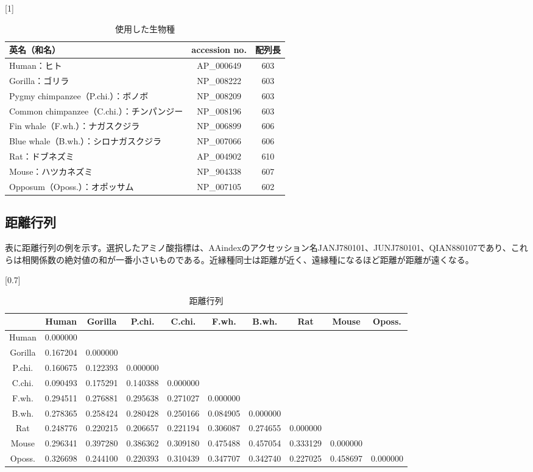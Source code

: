 \documentclass[twocolumn,paper=a4paper,landscape,fontsize=9pt]{jlreq}
\begin{document}
\begin{table}[h]
\centering
\caption{使用した生物種}
\scalebox{1}[1]{
\begin{tabular}{|l|c|c|} \hline
英名（和名）& accession no. & 配列長 \\ \hline
Human：ヒト & AP\_000649 & 603 \\[-2mm]
Gorilla：ゴリラ & NP\_008222 & 603 \\[-2mm]
Pygmy chimpanzee（P.chi.）：ボノボ & NP\_008209 & 603 \\[-2mm]
Common chimpanzee（C.chi.）：チンパンジー & NP\_008196 & 603 \\[-2mm]
Fin whale（F.wh.）：ナガスクジラ & NP\_006899 & 606 \\[-2mm]
Blue whale（B.wh.）：シロナガスクジラ & NP\_007066 & 606 \\[-2mm]
Rat：ドブネズミ & AP\_004902 & 610 \\[-2mm]
Mouse：ハツカネズミ  & NP\_904338 & 607 \\[-2mm]
Opposum（Oposs.）：オポッサム & NP\_007105 & 602 \\ \hline
\end{tabular}}
\end{table}

\subsection{距離行列}
表に距離行列の例を示す。選択したアミノ酸指標は、AAindexのアクセッション名JANJ780101、JUNJ780101、QIAN880107であり、これらは相関係数の絶対値の和が一番小さいものである。近縁種同士は距離が近く、遠縁種になるほど距離が距離が遠くなる。

\begin{table}[h]
  \centering
  \caption{距離行列}
  \scalebox{0.7}[0.7]{
  \begin{tabular}{|c|c|c|c|c|c|c|c|c|c|} \hline
   & Human & Gorilla & P.chi. & C.chi. & F.wh. & B.wh. & Rat & Mouse & Oposs. \\ \hline
  Human & 0.000000  & &  & & & & & &  \\ 
  Gorilla & 0.167204  & 0.000000  & & & & & & &  \\ 
  P.chi. & 0.160675  & 0.122393  & 0.000000  & &  & & & &  \\ 
  C.chi. & 0.090493  & 0.175291  & 0.140388  & 0.000000  & & & & &  \\
  F.wh. & 0.294511  & 0.276881  & 0.295638  & 0.271027  & 0.000000  & & & &  \\ 
  B.wh. & 0.278365  & 0.258424  & 0.280428  & 0.250166  & 0.084905  & 0.000000  & & &  \\ 
  Rat & 0.248776  & 0.220215  & 0.206657  & 0.221194  & 0.306087  & 0.274655  & 0.000000  & &  \\ 
  Mouse & 0.296341  & 0.397280  & 0.386362  & 0.309180  & 0.475488  & 0.457054  & 0.333129  & 0.000000  &  \\ 
  Oposs. & 0.326698  & 0.244100  & 0.220393  & 0.310439  & 0.347707  & 0.342740  & 0.227025  & 0.458697  & 0.000000  \\ \hline
  \end{tabular}}
  \end{table}
\end{document}

